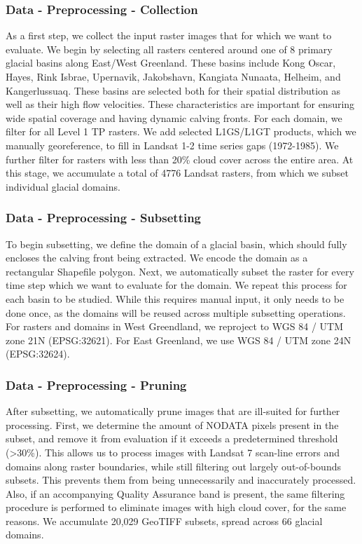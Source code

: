 \documentclass[tc, manuscript]{copernicus}
\begin{document}
\subsubsection{Data - Preprocessing - Collection}
As a first step, we collect the input raster images that for which we want to evaluate. We begin by selecting all rasters centered around  one of 8 primary glacial basins along East/West Greenland. These basins include Kong Oscar, Hayes, Rink Isbrae, Upernavik, Jakobshavn, Kangiata Nunaata, Helheim, and Kangerlussuaq. These basins are selected both for their spatial distribution as well as their high flow velocities. These characteristics are important for ensuring wide spatial coverage and having dynamic calving fronts. For each domain, we filter for all Level 1 TP rasters. We add selected L1GS/L1GT products, which we manually georeference, to fill in Landsat 1-2 time series gaps (1972-1985). We further filter for rasters with less than 20\% cloud cover across the entire area. At this stage, we accumulate a total of 4776 Landsat rasters, from which we subset individual glacial domains. 

\subsubsection{Data - Preprocessing - Subsetting}
To begin subsetting, we define the domain of a glacial basin, which should fully encloses the calving front being extracted. We encode the domain as a rectangular Shapefile polygon. Next, we automatically subset the raster for every time step which we want to evaluate for the domain. We repeat this process for each basin to be studied. While this requires manual input, it only needs to be done once, as the domains will be reused across multiple subsetting operations. For rasters and domains in West Greendland, we reproject to WGS 84 / UTM zone 21N (EPSG:32621). For East Greenland, we use WGS 84 / UTM zone 24N (EPSG:32624).

\subsubsection{Data - Preprocessing - Pruning}
After subsetting, we automatically prune images that are ill-suited for further processing. First, we determine the amount of NODATA pixels present in the subset, and remove it from evaluation if it exceeds a predetermined threshold (>30\%). This allows us to process images with Landsat 7 scan-line errors and domains along raster boundaries, while still filtering out largely out-of-bounds subsets. This prevents them from being unnecessarily and inaccurately processed. Also, if an accompanying Quality Assurance band is present, the same filtering procedure is performed to eliminate images with high cloud cover, for the same reasons. We accumulate 20,029 GeoTIFF subsets, spread across 66 glacial domains.
\end{document}

